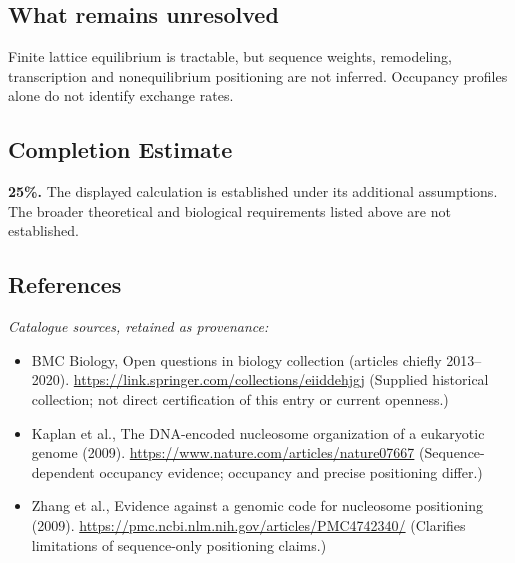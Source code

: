 \documentclass[11pt]{article}
\begin{document}
\subsection{What remains unresolved}
Finite lattice equilibrium is tractable, but sequence weights, remodeling, transcription and nonequilibrium positioning are not inferred. Occupancy profiles alone do not identify exchange rates.
\subsection{Completion Estimate}
\textbf{25\%.} The displayed calculation is established under its additional assumptions. The broader theoretical and biological requirements listed above are not established.
\subsection{References}
\noindent\emph{Catalogue sources, retained as provenance:}
\begin{itemize}
\item BMC Biology, Open questions in biology collection (articles chiefly 2013--2020). \url{https://link.springer.com/collections/eiiddehjgj} (Supplied historical collection; not direct certification of this entry or current openness.)
\item Kaplan et al., The DNA-encoded nucleosome organization of a eukaryotic genome (2009). \url{https://www.nature.com/articles/nature07667} (Sequence-dependent occupancy evidence; occupancy and precise positioning differ.)
\item Zhang et al., Evidence against a genomic code for nucleosome positioning (2009). \url{https://pmc.ncbi.nlm.nih.gov/articles/PMC4742340/} (Clarifies limitations of sequence-only positioning claims.)
\end{itemize}
\clearpage


\appendix
\end{document}
